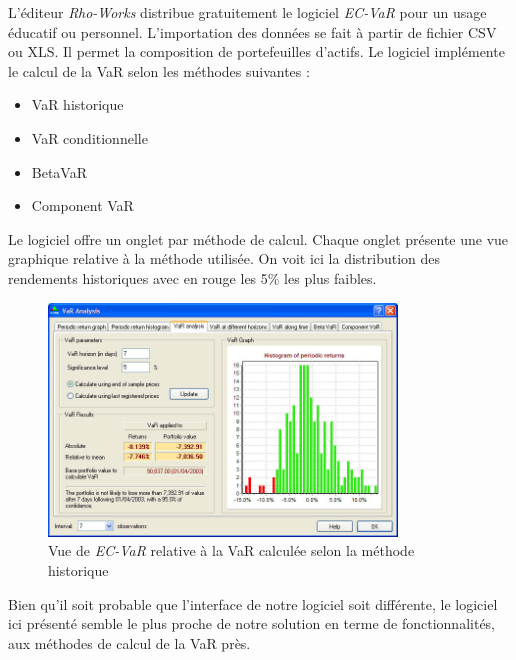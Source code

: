 		L'éditeur \textit{Rho-Works} distribue gratuitement le logiciel \textit{EC-VaR} pour un usage éducatif ou personnel. L'importation des données se fait à partir de fichier CSV ou XLS. Il permet la composition de portefeuilles d'actifs. Le logiciel implémente le calcul de la VaR selon les méthodes suivantes :
		\begin{itemize}
			\item VaR historique
			\item VaR conditionnelle
			\item BetaVaR
			\item Component VaR %
		\end{itemize}
		\nocite{website:Rho-Works}

		Le logiciel offre un onglet par méthode de calcul. Chaque onglet présente une vue graphique relative à la méthode utilisée. On voit ici la distribution des rendements historiques avec en rouge les 5\% les plus faibles.

		\begin{figure}[h]
			\center
			\includegraphics[width=350px]{ecvar_1b.jpg}
			\caption{Vue de \textit{EC-VaR} relative à la VaR calculée selon la méthode historique}
		\end{figure}

		Bien qu'il soit probable que l'interface de notre logiciel soit différente, le logiciel ici présenté semble le plus proche de notre solution en terme de fonctionnalités, aux méthodes de calcul de la VaR près. %

